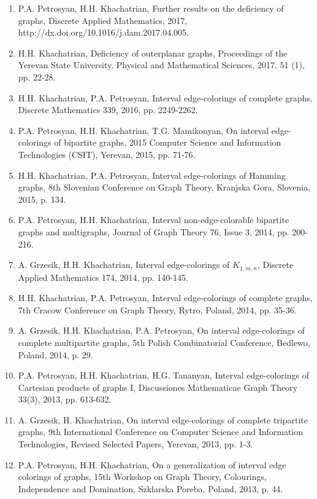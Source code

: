 \begin{enumerate}
    \itemsep0em 
    \item P.A. Petrosyan, H.H. Khachatrian, Further results on the deficiency of graphs, Discrete Applied Mathematics, 2017, http://dx.doi.org/10.1016/j.dam.2017.04.005.
    \item H.H. Khachatrian, Deficiency of outerplanar graphs, Proceedings of the Yerevan State University. Physical and Mathematical Sciences, 2017, 51 (1), pp. 22-28.
    \item H.H. Khachatrian, P.A. Petrosyan, Interval edge-colorings of complete graphs, Discrete Mathematics 339, 2016, pp. 2249-2262.
    \item P.A. Petrosyan, H.H. Khachatrian, T.G. Mamikonyan, On interval edge-colorings of bipartite graphs, 2015 Computer Science and Information Technologies (CSIT), Yerevan, 2015, pp. 71-76.
    \item H.H. Khachatrian, P.A. Petrosyan, Interval edge-colorings of Hamming graphs, 8th Slovenian Conference on Graph Theory, Kranjska Gora, Slovenia, 2015, p. 134.
    \item P.A. Petrosyan, H.H. Khachatrian, Interval non-edge-colorable bipartite graphs and multigraphs, Journal of Graph Theory 76, Issue 3, 2014, pp. 200-216.
    \item A. Grzesik, H.H. Khachatrian, Interval edge-colorings of $K_{1,m,n}$, Discrete Applied Mathematics 174, 2014, pp. 140-145.
    \item H.H. Khachatrian, P.A. Petrosyan, Interval edge-colorings of complete graphs, 7th Cracow Conference on Graph Theory, Rytro, Poland, 2014, pp. 35-36.
    \item A. Grzesik, H.H. Khachatrian, P.A. Petrosyan, On interval edge-colorings of complete multipartite graphs, 5th Polish Combinatorial Conference, Bedlewo, Poland, 2014, p. 29.
    \item P.A. Petrosyan, H.H. Khachatrian, H.G. Tananyan, Interval edge-colorings of Cartesian products of graphs I, Discussiones Mathematicae Graph Theory 33(3), 2013, pp. 613-632.
    \item A. Grzesik, H. Khachatrian, On interval edge-colorings of complete tripartite graphs, 9th International Conference on Computer Science and Information Technologies, Revised Selected Papers, Yerevan, 2013, pp. 1-3.
    \item P.A. Petrosyan, H.H. Khachatrian, On a generalization of interval edge colorings of graphs, 15th Workshop on Graph Theory, Colourings, Independence and Domination, Szklarska Poreba, Poland, 2013, p. 44.

\end{enumerate}
